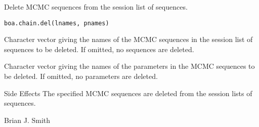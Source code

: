 \begin{Description}\relax
Delete MCMC sequences from the session list of sequences.
\end{Description}
\begin{Usage}
\begin{verbatim}
boa.chain.del(lnames, pnames)
\end{verbatim}
\end{Usage}
\begin{Arguments}
\begin{ldescription}
\item[\code{lnames}] Character vector giving the names of the MCMC sequences in the
session list of sequences to be deleted. If omitted, no sequences are deleted.
\item[\code{pnames}] Character vector giving the names of the parameters in the MCMC
sequences to be deleted. If omitted, no parameters are deleted.
\end{ldescription}
\end{Arguments}
\begin{Section}{Side Effects}
The specified MCMC sequences are deleted from the session lists of sequences.
\end{Section}
\begin{Author}\relax
Brian J. Smith
\end{Author}


